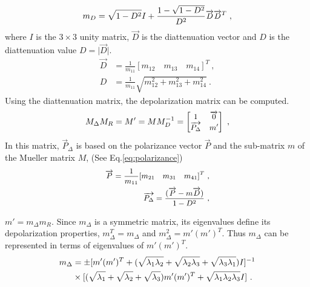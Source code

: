 	\begin{equation}\label{eq:Diatt}
	\small
     m_{D}  = \sqrt{1-D^{2}}I  + \frac{1 - \sqrt{1-D^{2}}}{D^{2}} \overrightarrow{D} \overrightarrow{D}^{T}~,
	\end{equation}
\noindent where $I$ is the $3 \times 3$ unity matrix, $\overrightarrow{D}$ is the diattenuation vector and $D$ is the diattenuation value $D = \vert \overrightarrow{D} \vert$. 
\begin{align}\label{eq:diattenuationvec}
\overrightarrow{D} & = \frac{1}{m_{11}} [m_{12}\quad m_{13} \quad m_{14}]^{T}~,\\
D & = \frac{1}{m_{11}} \sqrt{m_{12}^{2} + m_{13}^{2} + m_{14}^{2}}~.
\end{align}
Using the diattenuation matrix, the depolarization matrix can be computed.
	\begin{equation}\label{eq:reformLCD}
	\small
	M_{\Delta}M_{R} = M' = M M_{D}^{-1} =
	\begin{bmatrix}
	1 & \overrightarrow{0}\\
	\overrightarrow{P_{\Delta}} & m'
	\end{bmatrix}~,
	\end{equation}
\noindent In this matrix, $\overrightarrow{P}_{\Delta}$ is based on  the polarizance vector $\overrightarrow{P}$ and the sub-matrix $m$ of the Mueller matrix $M$, (See Eq.\ref{eq:polarizance}) 	
	\begin{subequations}\label{eq:polarizance}
	\small
	\begin{align}	
	\overrightarrow{P} = \frac{1}{m_{11}}[m_{21} \quad m_{31} \quad m_{41} ]^{T}~,\\
	\overrightarrow{P_{\Delta}} = \frac{(\overrightarrow{P} - m \overrightarrow{D})}{1-D^{2}}~,
	\end{align}
	\end{subequations}
	
\noindent $m' = m_{\Delta}m_{R}$.
Since $m_{\Delta}$ is a symmetric matrix, its eigenvalues define its depolarization properties, $m_{\Delta}^{T} = m_{\Delta}$ and $m_{\Delta}^{2} = m'(m')^{T}$. Thus $m_{\Delta}$ can be represented in terms of eigenvalues of $m'(m')^{T}$.
\begin{align*}
\small 
m_{\Delta} & = \pm[m'(m')^{T} + (\sqrt{\lambda_{1}\lambda_{2}} + \sqrt{\lambda_{2}\lambda_{3}} + \sqrt{\lambda_{3}\lambda_{1}})I]^{-1} \\
& \times [(\sqrt{\lambda_{1}} +\sqrt{\lambda_{2}} + \sqrt{\lambda_{3}})m'(m')^{T} + \sqrt{\lambda_{1}\lambda_{2}\lambda_{3}} I]~.
\end{align*}

